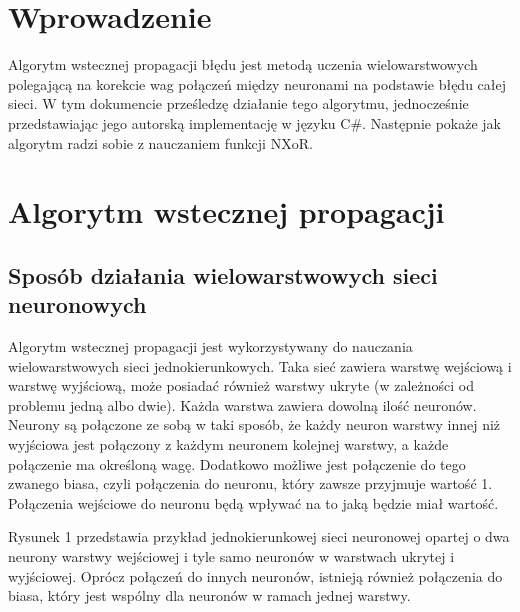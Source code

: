  



\maketitle
\tableofcontents{}
\newpage


\section{Wprowadzenie}
Algorytm wstecznej propagacji błędu jest metodą uczenia wielowarstwowych polegającą na korekcie wag połączeń między neuronami na podstawie błędu całej sieci.
W tym dokumencie prześledzę działanie tego algorytmu,
jednocześnie przedstawiając jego autorską implementację w języku C\#.
Następnie pokaże jak algorytm radzi sobie z nauczaniem funkcji NXoR.

\section{Algorytm wstecznej propagacji}
\subsection{Sposób działania wielowarstwowych sieci neuronowych}
Algorytm wstecznej propagacji jest wykorzystywany do nauczania wielowarstwowych sieci jednokierunkowych.
Taka sieć zawiera warstwę wejściową i warstwę wyjściową,
może posiadać również warstwy ukryte (w zależności od problemu jedną albo dwie).
Każda warstwa zawiera dowolną ilość neuronów.
Neurony są połączone ze sobą w taki sposób, że każdy neuron warstwy innej niż wyjściowa jest połączony z każdym neuronem kolejnej warstwy,
a każde połączenie ma określoną wagę.
Dodatkowo możliwe jest połączenie do tego zwanego biasa, czyli połączenia do neuronu, który zawsze przyjmuje wartość 1.
Połączenia wejściowe do neuronu będą wpływać na to jaką będzie miał wartość.

Rysunek 1 przedstawia przykład jednokierunkowej sieci neuronowej opartej o dwa neurony warstwy wejściowej i tyle samo neuronów w warstwach ukrytej i wyjściowej. 
Oprócz połączeń do innych neuronów, istnieją również połączenia do biasa, który jest wspólny dla neuronów w ramach jednej warstwy.

